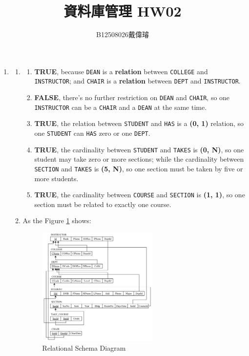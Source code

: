 \documentclass[12pt,a4paper]{article}
\title{資料庫管理 HW02}
\author{B12508026戴偉璿}
\date{}
\begin{document}
\maketitle


\begin{enumerate}
    \item
    \begin{enumerate}
        \item
        \begin{enumerate}
            \item \textbf{TRUE}, because \texttt{DEAN} is a \textbf{relation} between \texttt{COLLEGE} and \texttt{INSTRUCTOR}; and \texttt{CHAIR} is a \textbf{relation} between \texttt{DEPT} and \texttt{INSTRUCTOR}.
            \item \textbf{FALSE}, there's no further restriction on \texttt{DEAN} and \texttt{CHAIR}, so one \texttt{INSTRUCTOR} can be a \texttt{CHAIR} and a \texttt{DEAN} at the same time.
            \item \textbf{TRUE}, the relation between \texttt{STUDENT} and \texttt{HAS} is a \textbf{(0, 1)} relation, so one \texttt{STUDENT} can \texttt{HAS} zero or one \texttt{DEPT}.
            \item \textbf{TRUE}, the cardinality between \texttt{STUDENT} and \texttt{TAKES} is \textbf{(0, N)}, so one student may take zero or more sections; while the cardinality between \texttt{SECTION} and \texttt{TAKES} is \textbf{(5, N)}, so one section must be taken by five or more students.
            \item \textbf{TRUE}, the cardinality between \texttt{COURSE} and \texttt{SECTION} is \textbf{(1, 1)}, so one section must be related to exactly one course.
        \end{enumerate}
        \item As the Figure \ref{fig:ER_diagram} shows:
        
        \begin{figure}[H]
            \centering
            \includegraphics[width=0.6\textwidth]{src/1B.png}
            \caption{Relational Schema Diagram}
            \label{fig:ER_diagram}
        \end{figure}


\end{enumerate}
\end{enumerate}
\end{document}
